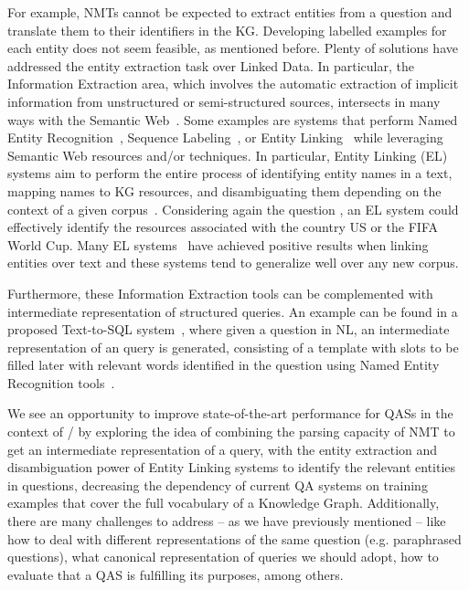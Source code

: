 For example, NMTs cannot be expected to extract entities from a question and translate them to their 
identifiers in the KG. Developing labelled examples for each entity does not seem feasible, as 
mentioned before. Plenty of solutions have addressed the entity extraction task over Linked Data. In 
particular, the Information Extraction area, which involves the automatic extraction of implicit 
information from unstructured or semi-structured sources, intersects in many ways with the 
Semantic Web~\cite{infExtr:MartinezHL19}. Some examples are systems that perform Named Entity 
Recognition~\cite{ner:LampleBSKD16}, Sequence Labeling~\cite{seqlab:MaH16, 
seqlab:contextual-emb-AkbikBV18}, or Entity Linking~\cite{EL:dbpedia-spotlight-MendesJGB11, 
EL:aida-tool-YosefHBSW11, EL:tagme-FerraginaS10, EL:opentapioca-Delpeuch19} while leveraging Semantic 
Web resources and/or techniques. In particular, Entity Linking (EL) systems aim to perform the entire 
process of identifying entity names in a text, mapping names to KG resources, and disambiguating them 
depending on the context of a given corpus~\cite{EL:survey-WuHH18}. Considering again the question 
, an EL system could effectively 
identify the resources associated with the country US or the FIFA World Cup. Many EL 
systems~\cite{EL:dbpedia-spotlight-MendesJGB11, EL:aida-tool-YosefHBSW11, EL:tagme-FerraginaS10, 
EL:opentapioca-Delpeuch19} have achieved positive results when linking entities over text and 
these systems tend to generalize well over any new corpus. 

Furthermore, these Information Extraction tools can be complemented with intermediate 
representation of structured queries. An example can be found in a proposed 
Text-to-SQL system~\cite{semPar:txt-to-sql-RadevKZZFRS18}, where given a question in NL, an 
intermediate representation of an \SQL{} query is generated, consisting of a \SQL{} template with slots to 
be filled later with relevant words identified in the question using Named Entity Recognition 
tools~\cite{ner:dynet-NeubigDGMAABCCC17}.

We see an opportunity to improve state-of-the-art performance for QASs in the context 
of \RDF/\SPARQL{} by exploring the idea of combining the parsing capacity of NMT to get an 
intermediate representation of a \SPARQL{} query, with the entity extraction and disambiguation 
power of Entity Linking systems to identify the relevant entities in questions, decreasing 
the dependency of current QA systems on training examples that cover the full vocabulary of a 
Knowledge Graph. Additionally, there are many challenges to address – as we have previously mentioned 
– like how to deal with different representations of the same question (e.g. paraphrased questions), 
what canonical representation of \SPARQL{} queries we should adopt, how to evaluate 
that a QAS is fulfilling its purposes, among others.